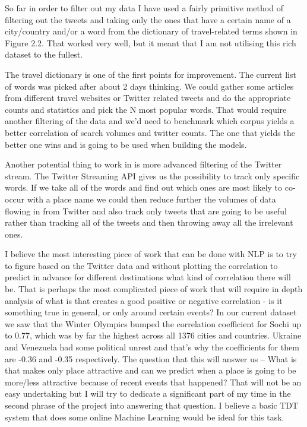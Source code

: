 \documentclass[minf,twoside,singlespacing,parskip,frontabs]{infthesis}
\begin{document}
So far in order to filter out my data I have used a fairly primitive method of filtering out the tweets and taking only the ones that have a certain name of a city/country and/or a word from the dictionary of travel-related terms shown in Figure 2.2. That worked very well, but it meant that I am not utilising this rich dataset to the fullest. 


The travel dictionary is one of the first points for improvement. The current list of words was picked after about 2 days thinking. We could gather some articles from different travel websites or Twitter related tweets and do the appropriate counts and statistics and pick the N most popular words. That would require another filtering of the data and we'd need to benchmark  which corpus yields a better correlation of search volumes and twitter counts. The one that yields the better one wins and is going to be used when building the models.


Another potential thing to work in is more advanced filtering of the Twitter stream. The Twitter Streaming API gives us the possibility to track only specific words. If we take all of the words and find out which ones are most likely to co-occur with a place name we could then reduce further the volumes of data flowing in from Twitter and also track only tweets that are going to be useful rather than tracking all of the tweets and then throwing away all the irrelevant ones. 


I believe the most interesting piece of work that can be done with NLP is to try to figure based on the Twitter data and without plotting the correlation to predict in advance for different destinations what kind of correlation there will be. That is perhaps the most complicated piece of work that will require in depth analysis of what is that creates a good positive or negative correlation - is it something true in general, or only around certain events? In our current dataset we saw that the Winter Olympics bumped the correlation coefficient for Sochi up to 0.77, which was by far the highest across all 1376 cities and countries. Ukraine and Venezuela had some political unrest and that's why the coefficients for them are -0.36 and -0.35 respectively. The question that this will answer us -- What is that makes only place attractive and can we predict when a place is going to be more/less attractive because of recent events that happened? That will not be an easy undertaking but I will try to dedicate a significant part of my time in the second phrase of the project into answering that question. I believe a basic TDT system that does some online Machine Learning would be ideal for this task. 
\end{document}
